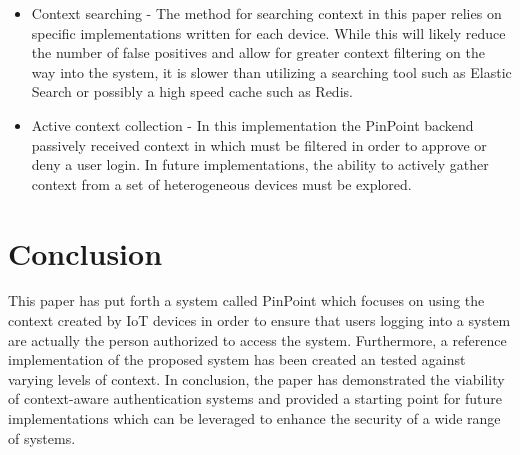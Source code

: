 \documentclass[11pt,journal]{IEEEtran}
\begin{document}
\begin{itemize}
	\item Context searching - The method for searching context in this paper relies on specific implementations written for each device.  While this will likely reduce the number of false positives and allow for greater context filtering on the way into the system, it is slower than utilizing a searching tool such as Elastic Search or possibly a high speed cache such as Redis.  
	\item Active context collection - In this implementation the PinPoint backend passively received context in which must be filtered in order to approve or deny a user login.  In future implementations, the ability to actively gather context from a set of heterogeneous devices must be explored.
\end{itemize}

\section{Conclusion}

This paper has put forth a system called PinPoint which focuses on using the context created by IoT devices in order to ensure that users logging into a system are actually the person authorized to access the system. Furthermore, a reference implementation of the proposed system has been created an tested against varying levels of context.  In conclusion, the paper has demonstrated the viability of context-aware authentication systems and provided a starting point for future implementations which can be leveraged to enhance the security of a wide range of systems.




\end{document}
